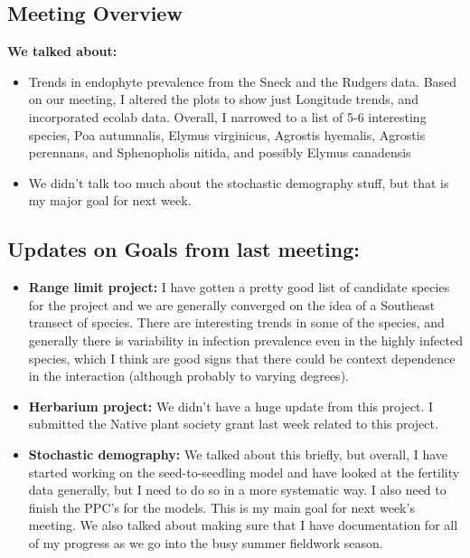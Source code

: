 \documentclass{article}
\begin{document}
\subsection*{Meeting Overview}
\textbf{We talked about:}
\begin{itemize}
\item{Trends in endophyte prevalence from the Sneck and the Rudgers data. Based on our meeting, I altered the plots to show just Longitude trends, and incorporated ecolab data. Overall, I narrowed to a list of 5-6 interesting species, Poa autumnalis, Elymus virginicus, Agrostis hyemalis, Agrostis perennans, and Sphenopholis nitida, and possibly Elymus canadensis}
\item{We didn't talk too much about the stochastic demography stuff, but that is my major goal for next week.}
\end{itemize}

\subsection*{Updates on Goals from last meeting:}
\begin{itemize}
\item{\textbf{Range limit project:} I have gotten a pretty good list of candidate species for the project and we are generally converged on the idea of a Southeast transect of species. There are interesting trends in some of the species, and generally there is variability in infection prevalence even in the highly infected species, which I think are good signs that there could be context dependence in the interaction (although probably to varying degrees).}
\item{\textbf{Herbarium project:} We didn't have a huge update from this project. I submitted the Native plant society grant last week related to this project.}
\item{\textbf{Stochastic demography:} We talked about this briefly, but overall, I have started working on the seed-to-seedling model and have looked at the fertility data generally, but I need to do so in a more systematic way. I also need to finish the PPC's for the models. This is my main goal for next week's meeting. We also talked about making sure that I have documentation for all of my progress as we go into the busy summer fieldwork season.}
\end{itemize}
\end{document}
